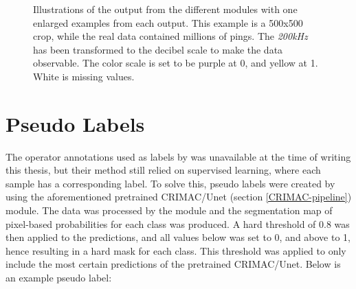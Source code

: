         
        \begin{figure}[H]
            \centering
            
            \caption[Module outputs illustration]{Illustrations of the output from the different modules with one enlarged examples from each output. This example is a 500x500 crop, while the real data contained millions of pings. The \textit{200kHz} has been transformed to the decibel scale to make the data observable. The color scale is set to be purple at 0, and yellow at 1. White is missing values.}
          	\medskip 
            \label{Module_outputs_illustration_fig}
        \end{figure}

    \section{Pseudo Labels} \label{Pseudo label}
        The operator annotations used as labels by \citeauthor{brautaset2020acoustic} was unavailable at the time of writing this thesis, but their method still relied on supervised learning, where each sample has a corresponding label. To solve this, pseudo labels were created by using the aforementioned pretrained CRIMAC/Unet (section \ref{CRIMAC-pipeline}) module. The data was processed by the module and the segmentation map of pixel-based probabilities for each class was produced. A hard threshold of 0.8 was then applied to the predictions, and all values below was set to 0, and above to 1, hence resulting in a hard mask for each class. This threshold was applied to only include the most certain predictions of the pretrained CRIMAC/Unet. Below is an example pseudo label:
        

